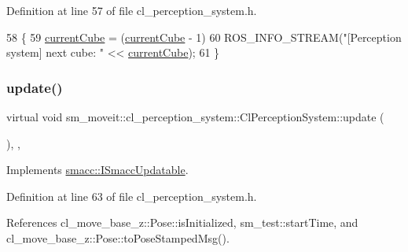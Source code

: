 Definition at line 57 of file cl\+\_\+perception\+\_\+system.\+h.


\begin{DoxyCode}
58     \{
59         \hyperlink{classsm__moveit_1_1cl__perception__system_1_1ClPerceptionSystem_a0ffeadfa41480c9d4d0fcc509237dff6}{currentCube} = (\hyperlink{classsm__moveit_1_1cl__perception__system_1_1ClPerceptionSystem_a0ffeadfa41480c9d4d0fcc509237dff6}{currentCube} - 1) %
60         ROS\_INFO\_STREAM(\textcolor{stringliteral}{"[Perception system] next cube: "} << \hyperlink{classsm__moveit_1_1cl__perception__system_1_1ClPerceptionSystem_a0ffeadfa41480c9d4d0fcc509237dff6}{currentCube});
61     \}
\end{DoxyCode}
\mbox{\label{classsm__moveit_1_1cl__perception__system_1_1ClPerceptionSystem_aaefca9001d3836655d38ee92621c013e}} 
\subsubsection{\texorpdfstring{update()}{update()}}
{\footnotesize\ttfamily virtual void sm\+\_\+moveit\+::cl\+\_\+perception\+\_\+system\+::\+Cl\+Perception\+System\+::update (\begin{DoxyParamCaption}{ }\end{DoxyParamCaption})\hspace{0.3cm}{\ttfamily [inline]}, {\ttfamily [override]}, {\ttfamily [virtual]}}



Implements \hyperlink{classsmacc_1_1ISmaccUpdatable_a84ee0520cbefdb1d412bed54650b028e}{smacc\+::\+I\+Smacc\+Updatable}.



Definition at line 63 of file cl\+\_\+perception\+\_\+system.\+h.



References cl\+\_\+move\+\_\+base\+\_\+z\+::\+Pose\+::is\+Initialized, sm\+\_\+test\+::start\+Time, and cl\+\_\+move\+\_\+base\+\_\+z\+::\+Pose\+::to\+Pose\+Stamped\+Msg().


